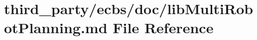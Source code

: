 \hypertarget{lib_multi_robot_planning_8md}{}\section{third\+\_\+party/ecbs/doc/lib\+Multi\+Robot\+Planning.md File Reference}
\label{lib_multi_robot_planning_8md}
